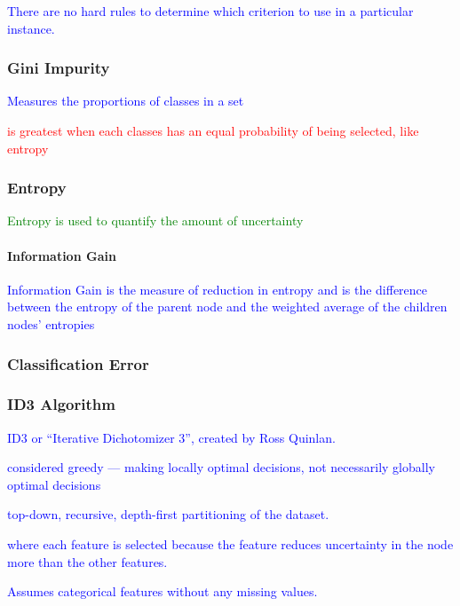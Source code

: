 \textcolor{blue}{There are no hard rules to determine which criterion to use in a particular instance.}

\subsubsection{Gini Impurity}

\textcolor{blue}{Measures the proportions of classes in a set}

\textcolor{red}{is greatest when each classes has an equal probability of being selected, like entropy}

\subsubsection{Entropy}

\textcolor{green}{Entropy is used to quantify the amount of uncertainty}

\paragraph{Information Gain}

\textcolor{blue}{Information Gain is the measure of reduction in entropy and is the difference between the entropy of the parent node and the weighted average of the children nodes' entropies}

\subsubsection{Classification Error}

\subsubsection{ID3 Algorithm}

\textcolor{blue}{ID3 or ``Iterative Dichotomizer 3'', created by Ross Quinlan.}

\textcolor{blue}{considered greedy --- making locally optimal decisions, not necessarily globally optimal decisions}

\textcolor{blue}{top-down, recursive, depth-first partitioning of the dataset.}

\textcolor{blue}{where each feature is selected because the feature reduces uncertainty in the node more than the other features.}

\textcolor{blue}{Assumes categorical features without any missing values.}

